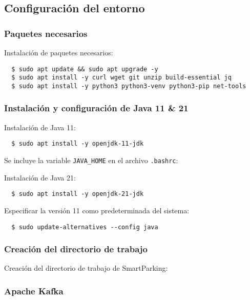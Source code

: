 \documentclass{../../../miPlantilla}
\begin{document}
\subsection{Configuración del entorno}
\subsubsection*{Paquetes necesarios}
\label{anexo:paquetes-vm}

Instalación de paquetes necesarios:
\begin{verbatim}
  $ sudo apt update && sudo apt upgrade -y
  $ sudo apt install -y curl wget git unzip build-essential jq
  $ sudo apt install -y python3 python3-venv python3-pip net-tools 
\end{verbatim}

\subsubsection*{Instalación y configuración de Java 11 \& 21}
\label{anexo:config-java}

Instalación de Java 11:
\begin{verbatim}
  $ sudo apt install -y openjdk-11-jdk
\end{verbatim}

Se incluye la variable \texttt{JAVA\_HOME} en el archivo \texttt{.bashrc}:

Instalación de Java 21:
\begin{verbatim}
  $ sudo apt install -y openjdk-21-jdk
\end{verbatim}

Especificar la versión 11 como predeterminada del sistema:
\begin{verbatim}
  $ sudo update-alternatives --config java
\end{verbatim}

\subsubsection*{Creación del directorio de trabajo}
\label{anexo:work-dir}

Creación del directorio de trabajo de SmartParking:

\subsubsection*{Apache Kafka}
\label{anexo:kafka}
\end{document}

